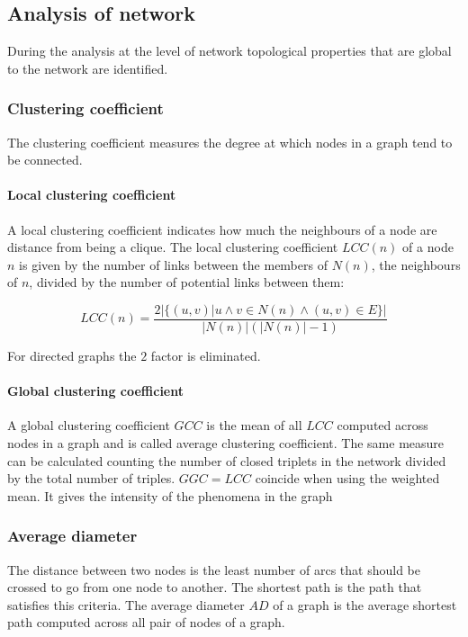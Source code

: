 	\subsection{Analysis of network}
	During the analysis at the level of network topological properties that are global to the network are identified.

		\subsubsection{Clustering coefficient}
		The clustering coefficient measures the degree at which nodes in a graph tend to be connected.

			\paragraph{Local clustering coefficient}
			A local clustering coefficient indicates how much the neighbours of a node are distance from being a clique.
			The local clustering coefficient $LCC(n)$ of a node $n$ is given by the number of links between the members of $N(n)$, the neighbours of $n$, divided by the number of potential links between them:

			$$LCC(n) = \frac{2|\{(u,v)|u\land v\in N(n)\land (u,v)\in E\}|}{|N(n)|(|N(n)|-1)}$$

			For directed graphs the $2$ factor is eliminated.

			\paragraph{Global clustering coefficient}
			A global clustering coefficient $GCC$ is the mean of all $LCC$ computed across nodes in a graph and is called average clustering coefficient.
			The same measure can be calculated counting the number of closed triplets in the network divided by the total number of triples.
			$GGC=LCC$ coincide when using the weighted mean.
			It gives the intensity of the phenomena in the graph

		\subsubsection{Average diameter}
		The distance between two nodes is the least number of arcs that should be crossed to go from one node to another.
		The shortest path is the path that satisfies this criteria.
		The average diameter $AD$ of a graph is the average shortest path computed across all pair of nodes of a graph.


